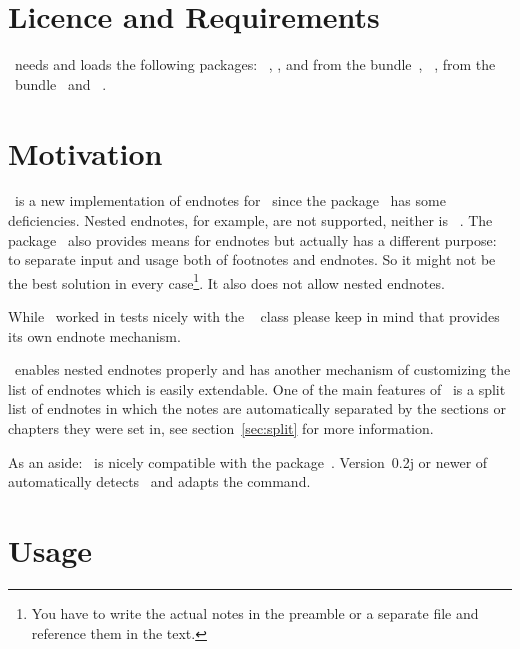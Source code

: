 \documentclass[load-preamble+]{cnltx-doc}
\begin{document}
\section{Licence and Requirements}
\license

\enotez\ needs and loads the following packages:
~\cite{bnd:l3kernel}, ,  and
 from the  bundle~\cite{bnd:l3packages},
~\cite{pkg:xpatch},  from the \KOMAScript\
bundle~\cite{bnd:koma-script} and ~\cite{pkg:translations}.

\section{Motivation}
\enotez\ is a new implementation of endnotes for \LaTeXe\ since the
\pkg{endnotes} package~\cite{pkg:endnotes} has some deficiencies.  Nested
endnotes, for example, are not supported, neither is
~\cite{pkg:hyperref}.  The 
package~\cite{pkg:sepfootnotes} also provides means for endnotes but actually
has a different purpose: to separate input and usage both of footnotes and
endnotes.  So it might not be the best solution in every case\footnote{You
  have to write the actual notes in the preamble or a separate file and
  reference them in the text.}.  It also does not allow nested endnotes.

While \enotez\ worked in tests nicely with the
~\cite{cls:memoir} class please keep in mind that
\cls{memoir} provides its own endnote mechanism.

\enotez\ enables nested endnotes properly and has another mechanism of
customizing the list of endnotes which is easily extendable.  One of the main
features of \enotez\ is a split list of endnotes in which the notes are
automatically separated by the sections or chapters they were set in, see
section~\ref{sec:split} for more information.

As an aside: \enotez\ is nicely compatible with the 
package~\cite{pkg:fnpct}.  Version~0.2j or newer of \pkg{fnpct} automatically
detects \enotez\ and adapts the \cs{endnote} command.


\section{Usage}
\end{document}
